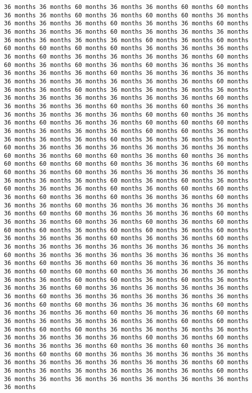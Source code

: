 \documentclass[11pt]{article}
\begin{document}
\begin{Verbatim}[commandchars=\\\{\}, frame=single, framerule=2mm, rulecolor=\color{outerrorbackground}]
36 months 36 months 60 months 36 months 36 months 60 months 60 months 36 months 36 months 60 months 36 months 60 months 60 months 36 months 36 months 36 months 36 months 60 months 36 months 36 months 60 months 36 months 36 months 36 months 60 months 36 months 36 months 36 months 36 months 36 months 36 months 36 months 60 months 36 months 60 months 60 months 60 months 60 months 60 months 36 months 36 months 36 months 36 months 60 months 36 months 36 months 36 months 36 months 60 months 60 months 36 months 60 months 36 months 60 months 36 months 36 months 36 months 36 months 36 months 60 months 36 months 36 months 36 months 36 months 36 months 36 months 36 months 36 months 36 months 60 months 36 months 36 months 60 months 36 months 36 months 36 months 36 months 36 months 36 months 36 months 36 months 36 months 36 months 60 months 36 months 36 months 36 months 60 months 36 months 60 months 36 months 36 months 36 months 36 months 36 months 60 months 60 months 36 months 36 months 60 months 36 months 36 months 60 months 60 months 60 months 36 months 36 months 36 months 36 months 60 months 60 months 36 months 36 months 36 months 36 months 60 months 36 months 36 months 36 months 60 months 36 months 36 months 36 months 36 months 36 months 36 months 60 months 36 months 60 months 60 months 36 months 60 months 36 months 60 months 60 months 60 months 60 months 36 months 36 months 60 months 60 months 36 months 60 months 36 months 36 months 36 months 36 months 36 months 36 months 36 months 60 months 36 months 60 months 36 months 60 months 36 months 36 months 60 months 36 months 60 months 60 months 36 months 60 months 36 months 60 months 36 months 36 months 60 months 36 months 36 months 60 months 36 months 36 months 36 months 36 months 36 months 60 months 60 months 36 months 36 months 36 months 60 months 36 months 36 months 60 months 36 months 60 months 36 months 60 months 60 months 60 months 36 months 60 months 60 months 36 months 60 months 36 months 36 months 36 months 60 months 36 months 36 months 60 months 36 months 36 months 36 months 36 months 36 months 36 months 36 months 60 months 36 months 36 months 36 months 36 months 36 months 36 months 36 months 60 months 36 months 60 months 36 months 36 months 36 months 36 months 60 months 60 months 60 months 36 months 36 months 36 months 36 months 36 months 60 months 60 months 36 months 60 months 36 months 36 months 36 months 60 months 36 months 36 months 36 months 36 months 36 months 60 months 36 months 36 months 36 months 36 months 36 months 36 months 60 months 60 months 36 months 36 months 36 months 60 months 36 months 36 months 36 months 60 months 36 months 36 months 60 months 36 months 36 months 36 months 36 months 36 months 60 months 60 months 36 months 60 months 60 months 36 months 36 months 36 months 36 months 36 months 36 months 36 months 36 months 60 months 36 months 60 months 36 months 36 months 36 months 60 months 36 months 60 months 36 months 36 months 60 months 60 months 36 months 36 months 36 months 36 months 36 months 36 months 36 months 36 months 36 months 36 months 60 months 36 months 36 months 36 months 36 months 36 months 36 months 60 months 36 months 36 months 36 months 36 months 36 months 36 months 36 months 36 months 
\end{Verbatim}
\end{document}
